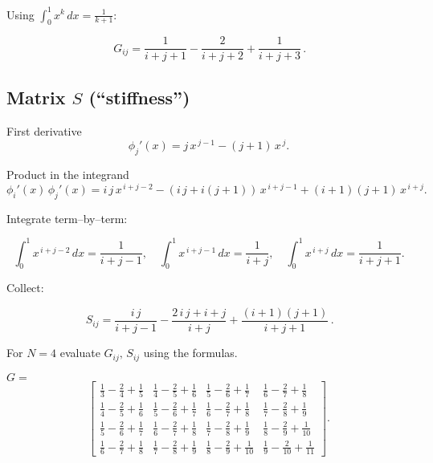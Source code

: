 \documentclass{article}
\begin{document}
Using $\displaystyle\int_{0}^{1}x^{k}\,dx=\frac{1}{k+1}$:

\[
\boxed{\,G_{ij}
=\frac{1}{i+j+1}-\frac{2}{i+j+2}+\frac{1}{i+j+3}\,}.
\]


\subsection*{Matrix $S$ (``stiffness'')}

First derivative  
\[
\phi_j'(x)=j\,x^{\,j-1}-(j+1)\,x^{\,j}.
\]

Product in the integrand  
\[
\phi_i'(x)\,\phi_j'(x)
=i\,j\,x^{\,i+j-2}
-(i\,j+i(j+1))\,x^{\,i+j-1}
+(i+1)(j+1)\,x^{\,i+j}.
\]

Integrate term–by–term:

\[
\int_{0}^{1}x^{\,i+j-2}\,dx=\frac{1}{i+j-1},
\quad
\int_{0}^{1}x^{\,i+j-1}\,dx=\frac{1}{i+j},
\quad
\int_{0}^{1}x^{\,i+j}\,dx=\frac{1}{i+j+1}.
\]

Collect:

\[
\boxed{\,S_{ij}=
\frac{i\,j}{i+j-1}
-\frac{2\,i\,j+i+j}{i+j}
+\frac{(i+1)(j+1)}{i+j+1}\,}.
\]


For $N=4$ evaluate $G_{ij},\,S_{ij}$ using the formulas.  
\vspace{4pt}

$G=$
\[
\begin{bmatrix}
\frac{1}{3}-\frac{2}{4}+\frac{1}{5} & \frac{1}{4}-\frac{2}{5}+\frac{1}{6} & \frac{1}{5}-\frac{2}{6}+\frac{1}{7} & \frac{1}{6}-\frac{2}{7}+\frac{1}{8}\\
\frac{1}{4}-\frac{2}{5}+\frac{1}{6} & \frac{1}{5}-\frac{2}{6}+\frac{1}{7} & \frac{1}{6}-\frac{2}{7}+\frac{1}{8} & \frac{1}{7}-\frac{2}{8}+\frac{1}{9}\\
\frac{1}{5}-\frac{2}{6}+\frac{1}{7} & \frac{1}{6}-\frac{2}{7}+\frac{1}{8} & \frac{1}{7}-\frac{2}{8}+\frac{1}{9} & \frac{1}{8}-\frac{2}{9}+\frac{1}{10}\\
\frac{1}{6}-\frac{2}{7}+\frac{1}{8} & \frac{1}{7}-\frac{2}{8}+\frac{1}{9} & \frac{1}{8}-\frac{2}{9}+\frac{1}{10}& \frac{1}{9}-\frac{2}{10}+\frac{1}{11}
\end{bmatrix}.
\]
\end{document}
